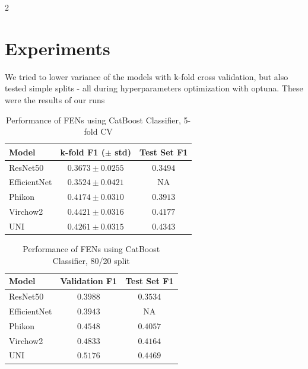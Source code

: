 \documentclass[11pt]{article}
\begin{document}
\begin{multicols}{2}
        \section{Experiments}
        We tried to lower variance of the models with k-fold cross validation, but also tested simple splits - all during hyperparameters optimization with optuna. These were the results of our runs 
        \begin{table}[H]
            \centering
            \setlength{\tabcolsep}{3pt}
            \caption{Performance of FENs using CatBoost Classifier, 5-fold CV}
            \begin{tabular}{lcc} %
                \toprule
                \textbf{Model} & \textbf{k-fold F1 ($\pm$ std)} & \textbf{Test Set F1} \\
                \midrule
                ResNet50 & $0.3673 \pm 0.0255$ & $0.3494$ \\
                EfficientNet & $0.3524 \pm 0.0421$ & NA \\
                Phikon & $0.4174 \pm 0.0310$ & $0.3913$ \\
                Virchow2 & $0.4421 \pm 0.0316$ & $0.4177$ \\
                UNI & $0.4261 \pm 0.0315 $ & $\boldsymbol{0.4343}$ \\
                \bottomrule
            \end{tabular}
            \label{tb:Measurements}
        \end{table}

        \begin{table}[H]
            \centering
            \setlength{\tabcolsep}{3pt}
            \caption{Performance of FENs using CatBoost Classifier, 80/20 split}
            \begin{tabular}{lcc} %
                \toprule
                \textbf{Model} & \hspace{0.3cm} \textbf{Validation F1} \hspace{0.3cm} & \textbf{Test Set F1} \\
                \midrule
                ResNet50 & $0.3988$  &  $0.3534$ \\
                EfficientNet &  $0.3943$  & NA \\
                Phikon & $0.4548$ & $0.4057$ \\
                Virchow2 &  $0.4833$  & $0.4164$ \\
                UNI & $0.5176$ & $\boldsymbol{0.4469}$ \\
                \bottomrule
            \end{tabular}
            \label{tb:Measurements}
        \end{table}


\end{multicols}
\end{document}

